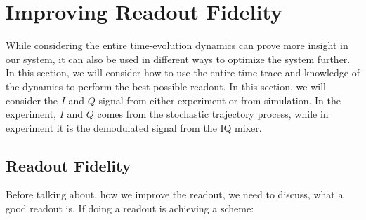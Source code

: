 \chapter{Improving Readout Fidelity}\label{chap:readout}
While considering the entire time-evolution dynamics can prove more insight in our system, it can also be used in different ways to optimize the system further. In this section, we will consider how to use the entire time-trace and knowledge of the dynamics to perform the best possible readout. In this section, we will consider the $I$ and $Q$ signal from either experiment or from simulation. In the experiment, $I$ and $Q$ comes from the stochastic trajectory process, while in experiment it is the demodulated signal from the IQ mixer.

\section{Readout Fidelity}
Before talking about, how we improve the readout, we need to discuss, what a good readout is. If doing a readout is achieving a scheme:

